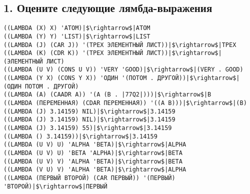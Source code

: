 \documentclass{amsart}
\begin{document}
\subsection{1. Оцените следующие лямбда-выражения}

\begin{verbatim}
((LAMBDA (X) X) 'ATOM)|$\rightarrow$|ATOM
((LAMBDA (Y) Y) 'LIST)|$\rightarrow$|LIST
((LAMBDA (J) (CAR J)) '(ТРЕХ ЭЛЕМЕНТНЫЙ ЛИСТ))|$\rightarrow$|ТРЕХ
((LAMBDA (K) (CDR K)) '(ТРЕХ ЭЛЕМЕНТНЫЙ ЛИСТ))|$\rightarrow$|(ЭЛЕМЕНТНЫЙ ЛИСТ)
((LAMBDA (U V) (CONS U V)) 'VERY 'GOOD)|$\rightarrow$|(VERY . GOOD)
((LAMBDA (Y X) (CONS Y X)) 'ОДИН '(ПОТОМ . ДРУГОЙ))|$\rightarrow$|(ОДИН ПОТОМ . ДРУГОЙ)
((LAMBDA (A) (CAADR A)) '(A (B . |77Q2|)))|$\rightarrow$|B
((LAMBDA (ПЕРЕМЕННАЯ) (CDAR ПЕРЕМЕННАЯ)) '((A B)))|$\rightarrow$|(B)
((LAMBDA (J) 3.14159) NIL)|$\rightarrow$|3.14159
((LAMBDA (J) 3.14159) NIL)|$\rightarrow$|3.14159
((LAMBDA (J) 3.14159) 55)|$\rightarrow$|3.14159
((LAMBDA () 3.14159))|$\rightarrow$|3.14159
((LAMBDA (U V) U) 'ALPHA 'BETA)|$\rightarrow$|ALPHA
((LAMBDA (U V) U) 'BETA 'ALPHA)|$\rightarrow$|BETA
((LAMBDA (U V) V) 'ALPHA 'BETA)|$\rightarrow$|BETA
((LAMBDA (V U) V) 'ALPHA 'BETA)|$\rightarrow$|ALPHA
((LAMBDA (ПЕРВЫЙ ВТОРОЙ) (CAR ПЕРВЫЙ)) '(ПЕРВЫЙ) 'ВТОРОЙ)|$\rightarrow$|ПЕРВЫЙ
\end{verbatim}
\end{document}
